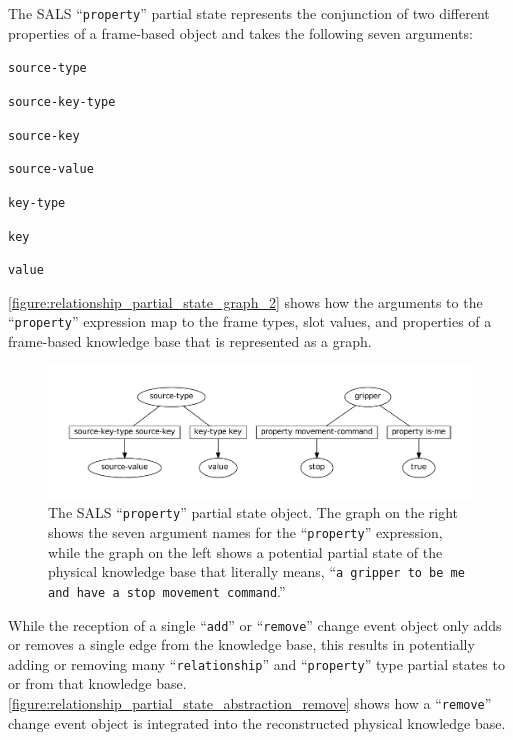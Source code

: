 The SALS ``{\tt{property}}'' partial state represents the conjunction
of two different properties of a frame-based object and takes the
following seven arguments:
\begin{packed_enumerate}
\item{{\tt{source-type}}}
\item{{\tt{source-key-type}}}
\item{{\tt{source-key}}}
\item{{\tt{source-value}}}
\item{{\tt{key-type}}}
\item{{\tt{key}}}
\item{{\tt{value}}}
\end{packed_enumerate}
{\mbox{\autoref{figure:relationship_partial_state_graph_2}}} shows how
the arguments to the ``{\tt{property}}'' expression map to the frame
types, slot values, and properties of a frame-based knowledge base
that is represented as a graph.
\begin{figure}
\centering
\includegraphics[width=12cm]{gfx/property_partial_state_graph}
\caption[The SALS ``{\tt{property}}'' partial state object.]{The SALS
  ``{\tt{property}}'' partial state object.  The graph on the right
  shows the seven argument names for the ``{\tt{property}}''
  expression, while the graph on the left shows a potential partial
  state of the physical knowledge base that literally means, ``{\tt{a
      gripper to be me and have a stop movement command}}.''}
\label{figure:property_partial_state_graph_2}
\end{figure}
While the reception of a single ``{\tt{add}}'' or ``{\tt{remove}}''
change event object only adds or removes a single edge from the
knowledge base, this results in potentially adding or removing many
``{\tt{relationship}}'' and ``{\tt{property}}'' type partial states to
or from that knowledge base.
{\mbox{\autoref{figure:relationship_partial_state_abstraction_remove}}}
shows how a ``{\tt{remove}}'' change event object is integrated into
the reconstructed physical knowledge base.
